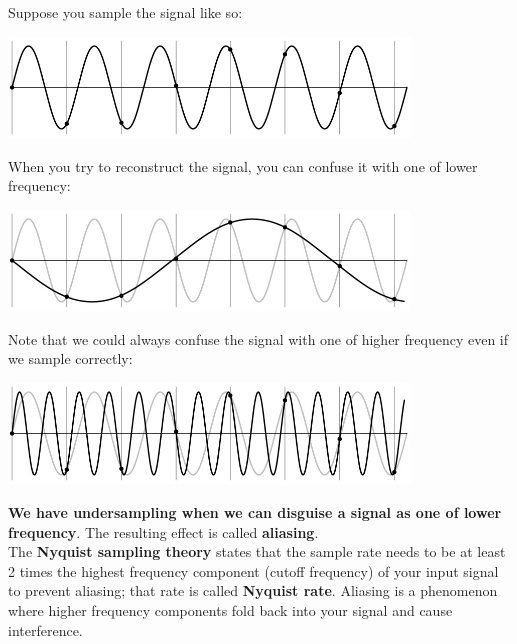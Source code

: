 \documentclass{article}
\begin{document}
Suppose you sample the signal like so:

\begin{center}
\includegraphics[width=0.8\textwidth]{images/undersampling.png}
\end{center}

When you try to reconstruct the signal, you can confuse it with one of lower frequency:

\begin{center}
\includegraphics[width=0.8\textwidth]{images/undersampling_lower_freq.png}
\end{center}

Note that we could always confuse the signal with one of higher frequency even if we sample correctly:

\begin{center}
\includegraphics[width=0.8\textwidth]{images/undersampling_higher_freq.png}
\end{center}

\newpage

\textbf{We have undersampling when we can disguise a signal as one of lower frequency}. The resulting effect is called \textbf{aliasing}. \\

The \textbf{Nyquist sampling theory} states that the sample rate needs to be at least 2 times the highest frequency component (cutoff frequency) of your input signal to prevent aliasing; that rate is called \textbf{Nyquist rate}. Aliasing is a phenomenon where higher frequency components fold back into your signal and cause interference.

\end{document}
